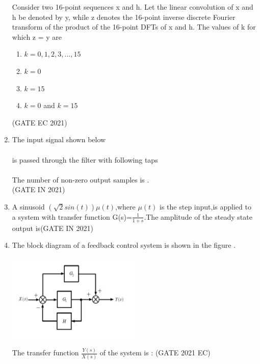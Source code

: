 \begin{enumerate}[label=\thechapter.\arabic*,ref=\thechapter.\theenumi]
Consider two 16-point sequences x and h. Let the linear convolution of x and h be denoted by y, while z denotes the 16-point inverse discrete Fourier transform  of the product of the 16-point DFTs of x and h. The values of k for which z = y are 
\begin{enumerate}
    \item $k = 0, 1, 2, 3, ... , 15$
    \item $k = 0$
    \item $k = 15$
    \item $k = 0$ and $k = 15$
\end{enumerate}
\hfill(GATE EC 2021)\\
\solution

\pagebreak
\item The input signal shown below \\
\\
is passed through the filter with following taps\\
\\
The number of non-zero output samples is \underline{\hspace{1cm}}.\\
\hfill(GATE IN 2021)
\solution

\pagebreak
\item A sinusoid $(\sqrt{2}sin(t))\mu(t)$,where $\mu(t)$ is the step input,is applied to a system with transfer function G(s)=$\frac{1}{1+s}$.The amplitude of the steady state output is\hfill{(GATE IN 2021)}\\
\solution

\pagebreak
\item The block diagram of a feedback control system is shown in the figure .
\begin{center}
\includegraphics[width=0.5\textwidth]{2021/EC/13/figs/figure1.png}
\end{center}
The transfer function $\frac{Y(s)}{X(s)}$ of the system is :
\hfill(GATE 2021 EC)\\

\end{enumerate}
